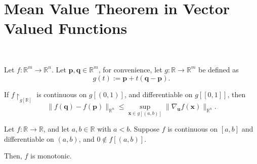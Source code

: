 

\section{Mean Value Theorem in Vector Valued Functions}


\begin{theorem}
	\label{thm: directional derivatives: mean value theorem: vector valued function}\
	
	Let $f: \mathbb R^m \to \mathbb R^n$. Let $\mathbf p, \mathbf q \in \mathbb R^m$, for convenience, let $g: \mathbb R \to \mathbb R^m$ be defined as
	$$
	g(t) := \mathbf p + t(\mathbf q - \mathbf p).
	$$
	
	If $f \restriction_{g[\mathbb R]}$ is continuous on $g[(0,1)]$, and differentiable on $g[[0,1]]$, then
	$$
	\| f(\mathbf q) - f(\mathbf p) \|_{\mathbb R^n} \le \sup_{\mathbf x \in g[(a,b)]} \| \nabla_{\mathbf u} f(\mathbf x) \|_{\mathbb R^n}.
	$$
\end{theorem}



\begin{lemma}
	\label{lm: non-zero derivative implies monotonic}
	Let $f: \mathbb R \to \mathbb R$, and let $a, b \in \mathbb R$ with $a < b$. Suppose $f$ is continuous on $[a,b]$ and differentiable on $(a,b)$, and $0 \notin f[(a,b)]$.
	
	Then, $f$ is monotonic.
\end{lemma}



